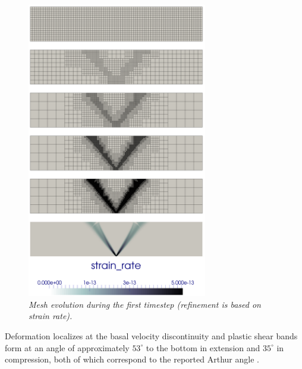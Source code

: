 \documentclass{article}
\begin{document}
\begin{figure}
   \centering
   \includegraphics[width=0.7\textwidth]{cookbooks/crustal_deformation/grids.png}
   \caption{\it Mesh evolution during the first timestep (refinement is based on strain rate).}
   \label{fig:meshes}
\end{figure}

 

Deformation localizes at the basal velocity discontinuity and plastic shear bands
form at an angle of approximately $53^\circ$ to the bottom in extension and 
$35^\circ$ in compression, both of which correspond to the reported Arthur angle \cite{kaus10,buit12}. 
\end{document}
